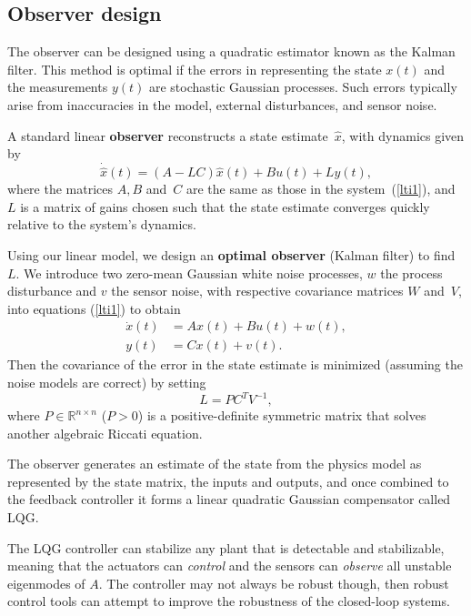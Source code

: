 \documentclass[12pt,lot, lof]{puthesis}
\begin{document}
\subsection{ Observer design}
The observer can be designed using a quadratic estimator known as the Kalman filter. This method is optimal if the errors in representing the state $x(t)$ and the measurements $y(t)$ are stochastic Gaussian processes. Such errors typically arise from inaccuracies in the model, external disturbances, and sensor noise.

A standard linear \textbf{observer} reconstructs a state estimate~$\hat x$, with dynamics given by
\begin{equation}
		\dot{\hat{x}}(t) = (A- L C) \hat{x}(t) + B u(t) + L y(t),
		\label{obslti}
\end{equation}
where the matrices $A,B$ and~$C$ are the same as those in the system~(\ref{lti1}), and $L$ is a matrix of gains chosen such that the state estimate converges quickly relative to the system's dynamics.

Using our linear model, we design an \textbf{optimal observer} (Kalman filter) to find~$L$.
We introduce two zero-mean Gaussian white noise processes, $w$ the process disturbance and $v$ the sensor noise, with respective covariance matrices $W$ and~$V$, into equations (\ref{lti1}) to obtain
\begin{align}
	\dot{x}(t) &= A x(t) + B u(t) + w(t),\\
	y(t) &= C x(t) + v(t). 
\end{align}
Then the covariance of the error in the state estimate is minimized (assuming the noise models are correct) by setting
\begin{equation}
	L = P C^T V^{-1},
\end{equation}
where $P \in \mathbb{R}^{n \times n}$ ($P>0$)  is a positive-definite symmetric matrix that solves another algebraic Riccati equation.

The observer generates an estimate of the state from the physics model as represented by the state matrix, the inputs and outputs, and once combined to the feedback controller it forms a linear quadratic Gaussian compensator called LQG.

The LQG controller can stabilize any plant that is detectable and stabilizable, meaning that the actuators can \emph{control} and the sensors can \emph{observe} all unstable eigenmodes of $A$. The controller may not always be robust though, then robust control tools can attempt to improve the robustness of the closed-loop systems.
\end{document}
